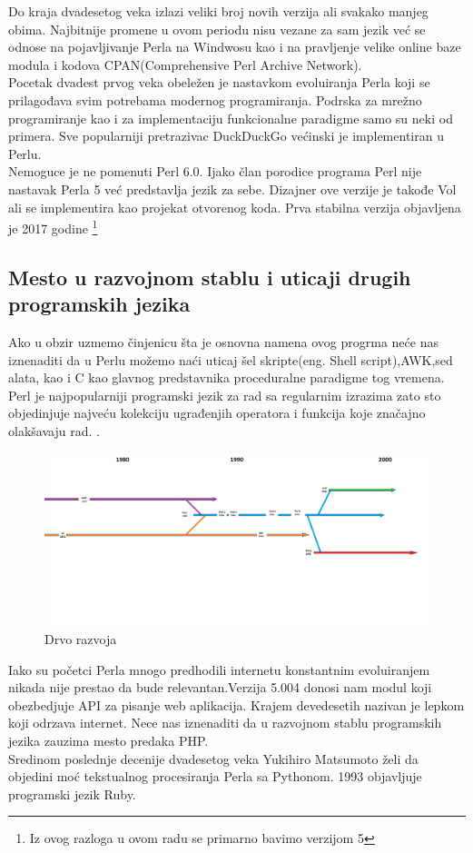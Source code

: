 \documentclass[12pt]{article}
\begin{document}
Do kraja dvadesetog veka izlazi veliki broj novih verzija ali svakako manjeg obima. Najbitnije promene u ovom periodu nisu vezane za sam jezik već se odnose na pojavljivanje Perla na Windwosu kao i na pravljenje velike online baze modula i kodova CPAN(Comprehensive Perl Archive Network).\\
Pocetak dvadest prvog veka obeležen je nastavkom evoluiranja Perla koji se prilagođava svim potrebama modernog programiranja. Podrska za mrežno programiranje kao i za implementaciju funkcionalne paradigme samo su neki od primera. Sve popularniji pretrazivac DuckDuckGo većinski je implementiran u Perlu\cite{duck}.\\
Nemoguce je ne pomenuti Perl 6.0. Ijako član porodice programa Perl nije nastavak Perla 5 već predstavlja jezik za sebe. Dizajner ove verzije je takođe Vol ali se implementira kao projekat otvorenog koda. Prva stabilna verzija objavljena je 2017 godine \footnote[1]{Iz ovog razloga u ovom radu se primarno bavimo verzijom 5}

\subsection{Mesto u razvojnom stablu i uticaji drugih programskih jezika}



Ako u obzir uzmemo činjenicu šta je osnovna namena ovog progrma neće nas iznenaditi da u  Perlu možemo naći uticaj šel skripte(eng. Shell script),AWK,sed alata, kao i C kao glavnog predstavnika proceduralne paradigme tog vremena. Perl je najpopularniji programski jezik za rad sa regularnim izrazima zato sto objedinjuje najveću kolekciju ugrađenjih operatora i funkcija koje značajno olakšavaju rad. \cite{friedl2006mastering}.\\

\begin{figure}[H]
\centering
\includegraphics[scale=0.25,angle=90]{drvoRazvoja.png}
\caption{Drvo razvoja}
\end{figure}
Iako su početci Perla mnogo predhodili internetu konstantnim evoluiranjem nikada nije prestao da bude relevantan.Verzija 5.004 donosi nam modul koji obezbedjuje API za pisanje web aplikacija. Krajem devedesetih nazivan je lepkom koji odrzava internet. Nece nas iznenaditi da u razvojnom stablu programskih jezika zauzima mesto predaka PHP.\\
Sredinom poslednje decenije dvadesetog veka Yukihiro Matsumoto želi da objedini moć tekstualnog procesiranja Perla sa Pythonom. 1993 objavljuje programski jezik Ruby.
\end{document}
